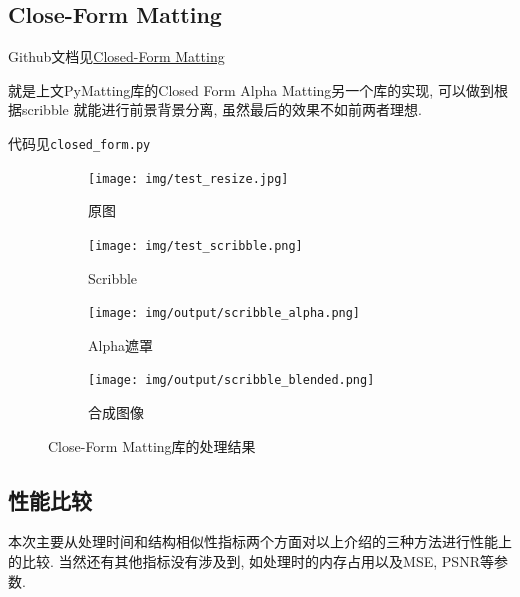 \documentclass[scheme=chinese,a4paper]{article}
\begin{document}
\subsection{Close-Form Matting}

Github文档见\href{https://github.com/MarcoForte/closed-form-matting}{Closed-Form Matting}

就是上文PyMatting库的Closed Form Alpha Matting\cite{4359322}另一个库的实现, 可以做到根据scribble
就能进行前景背景分离, 虽然最后的效果不如前两者理想. 


代码见\lstinline{closed_form.py}

\begin{figure}[H]
  \centering
  \begin{subfigure}{0.23\textwidth}
    \centering
    \texttt{[image: img/test\_resize.jpg]}
    \caption{原图}
  \end{subfigure}
  \begin{subfigure}{0.23\textwidth}
    \centering
    \texttt{[image: img/test\_scribble.png]}
    \caption{Scribble}
  \end{subfigure}
  \begin{subfigure}{0.23\textwidth}
    \centering
    \texttt{[image: img/output/scribble\_alpha.png]}
    \caption{Alpha遮罩}
  \end{subfigure}
  \begin{subfigure}{0.23\textwidth}
    \centering
    \texttt{[image: img/output/scribble\_blended.png]}
    \caption{合成图像}
  \end{subfigure}

  \caption{Close-Form Matting库的处理结果}
  \end{figure}


\subsection{性能比较}
本次主要从处理时间和结构相似性指标两个方面对以上介绍的三种方法进行性能上的比较. 当然还有其他指标没有涉及到, 如处理时的内存占用以及MSE, PSNR等参数. 
\end{document}
